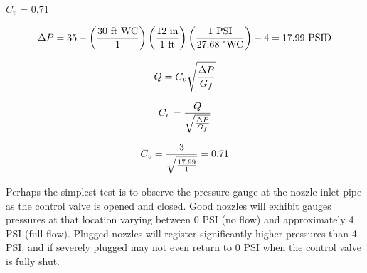 





$C_{v}$ = 0.71
 






$$\Delta P = 35 - \left(30 \hbox{ ft WC} \over 1 \right)  \left(12 \hbox{ in} \over 1 \hbox{ ft}\right)  \left(1 \hbox{ PSI} \over 27.68 \hbox{ "WC} \right) - 4 = 17.99 \hbox{ PSID}$$

$$Q = C_v \sqrt{\Delta P \over G_f}$$

$$C_v = {Q \over \sqrt{\Delta P \over G_f}}$$

$$C_v = {3 \over \sqrt{17.99 \over 1}} = 0.71$$


\vskip 10pt

Perhaps the simplest test is to observe the pressure gauge at the nozzle inlet pipe as the control valve is opened and closed.  Good nozzles will exhibit gauges pressures at that location varying between 0 PSI (no flow) and approximately 4 PSI (full flow).  Plugged nozzles will register significantly higher pressures than 4 PSI, and if severely plugged may not even return to 0 PSI when the control valve is fully shut.




